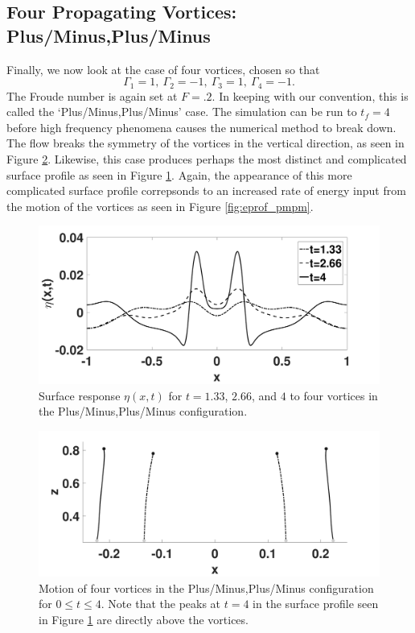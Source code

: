 \documentclass[a4paper,11pt]{article}
\begin{document}
\subsection{Four Propagating Vortices: Plus/Minus,Plus/Minus}
Finally, we now look at the case of four vortices, chosen so that
\[
\Gamma_{1}=1,~\Gamma_{2}=-1, ~ \Gamma_{3}=1,~\Gamma_{4}=-1.
\]
The Froude number is again set at $F=.2$.  In keeping with our convention, this is called the `Plus/Minus,Plus/Minus' case.  The simulation can be run to $t_{f}=4$ before high frequency phenomena causes the numerical method to break down.  The flow breaks the symmetry of the vortices in the vertical direction, as seen in Figure \ref{fig:trackpmpm}.  Likewise, this case produces perhaps the most distinct and complicated surface profile as seen in Figure \ref{fig:surfreppmpm}.  Again, the appearance of this more complicated surface profile correpsonds to an increased rate of energy input from the motion of the vortices as seen in Figure \ref{fig:eprof_pmpm}.
\begin{figure}[!h]
\centering
\includegraphics[width=.75\textwidth]{surf_resp_mu_pt2_F_pt2_pmpm}
\caption{Surface response $\eta(x,t)$ for $t=1.33$, $2.66$, and $4$ to four vortices in the Plus/Minus,Plus/Minus configuration.}
\label{fig:surfreppmpm}
\end{figure}
\begin{figure}[!h]
\centering
\includegraphics[width=.75\textwidth]{tracks_F_pt2_tf_4_pmpm}
\caption{Motion of four vortices in the Plus/Minus,Plus/Minus configuration for $0\leq t \leq 4$.  Note that the peaks at $t=4$ in the surface profile seen in Figure \ref{fig:surfreppmpm} are directly above the vortices.}
\label{fig:trackpmpm}
\end{figure}
\end{document}
